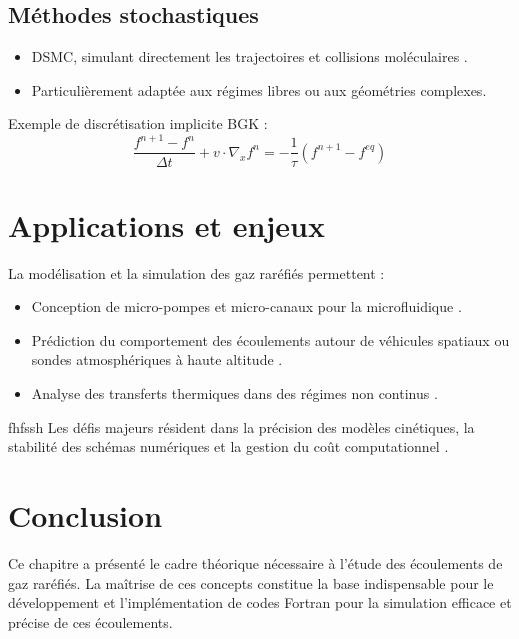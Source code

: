 \documentclass[12pt,a4paper]{report}
\begin{document}
	\subsection{Méthodes stochastiques}
	\begin{itemize}
		\item DSMC, simulant directement les trajectoires et collisions moléculaires \cite{garcia1999, boyd1995}.
		\item Particulièrement adaptée aux régimes libres ou aux géométries complexes.
	\end{itemize}
	
	Exemple de discrétisation implicite BGK :
	\begin{equation}
		\frac{f^{n+1} - f^n}{\Delta t} + v \cdot \nabla_x f^n = -\frac{1}{\tau} (f^{n+1} - f^{eq})
	\end{equation}
	
	\section{Applications et enjeux}
	
	La modélisation et la simulation des gaz raréfiés permettent :
	\begin{itemize}
		\item Conception de micro-pompes et micro-canaux pour la microfluidique \cite{karniadakis2005, sone2007}.
		\item Prédiction du comportement des écoulements autour de véhicules spatiaux ou sondes atmosphériques à haute altitude \cite{cercignani1988, garcia1999}.
		\item Analyse des transferts thermiques dans des régimes non continus \cite{boyd1995, hadjiconstantinou2003}.
	\end{itemize}
	fhfssh
	Les défis majeurs résident dans la précision des modèles cinétiques, la stabilité des schémas numériques et la gestion du coût computationnel \cite{bird1994, rogallo1994}.
	
	\section{Conclusion}
	
	Ce chapitre a présenté le cadre théorique nécessaire à l’étude des écoulements de gaz raréfiés. La maîtrise de ces concepts constitue la base indispensable pour le développement et l’implémentation de codes Fortran pour la simulation efficace et précise de ces écoulements.
	
\end{document}
